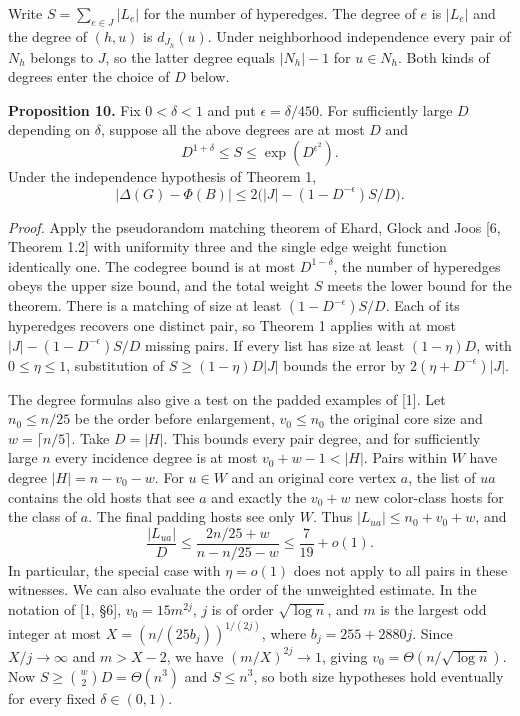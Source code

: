 \documentclass[english,11pt,a4paper]{article}
\begin{document}
Write \(S=\sum_{e\in J}|L_e|\) for the number of hyperedges. The degree of \(e\) is \(|L_e|\) and the degree of \((h,u)\) is \(d_{J_h}(u)\). Under neighborhood independence every pair of \(N_h\) belongs to \(J\), so the latter degree equals \(|N_h|-1\) for \(u\in N_h\). Both kinds of degrees enter the choice of \(D\) below.

\textbf{Proposition 10.} Fix \(0<\delta<1\) and put \(\epsilon=\delta/450\). For sufficiently large \(D\) depending on \(\delta\), suppose all the above degrees are at most \(D\) and \[
D^{1+\delta}\le S\le\exp(D^{\epsilon^2}).
\] Under the independence hypothesis of Theorem 1, \[
|\Delta(G)-\Phi(B)|\le
2\bigl(|J|-(1-D^{-\epsilon})S/D\bigr).
\]

\emph{Proof.} Apply the pseudorandom matching theorem of Ehard, Glock and Joos {[}6, Theorem 1.2{]} with uniformity three and the single edge weight function identically one. The codegree bound is at most \(D^{1-\delta}\), the number of hyperedges obeys the upper size bound, and the total weight \(S\) meets the lower bound for the theorem. There is a matching of size at least \((1-D^{-\epsilon})S/D\). Each of its hyperedges recovers one distinct pair, so Theorem 1 applies with at most \(|J|-(1-D^{-\epsilon})S/D\) missing pairs. If every list has size at least \((1-\eta)D\), with \(0\le\eta\le1\), substitution of \(S\ge(1-\eta)D|J|\) bounds the error by \(2(\eta+D^{-\epsilon})|J|\).

The degree formulas also give a test on the padded examples of {[}1{]}. Let \(n_0\le n/25\) be the order before enlargement, \(v_0\le n_0\) the original core size and \(w=\lceil n/5\rceil\). Take \(D=|H|\). This bounds every pair degree, and for sufficiently large \(n\) every incidence degree is at most \(v_0+w-1<|H|\). Pairs within \(W\) have degree \(|H|=n-v_0-w\). For \(u\in W\) and an original core vertex \(a\), the list of \(ua\) contains the old hosts that see \(a\) and exactly the \(v_0+w\) new color-class hosts for the class of \(a\). The final padding hosts see only \(W\). Thus \(|L_{ua}|\le n_0+v_0+w\), and \[
\frac{|L_{ua}|}{D}\le\frac{2n/25+w}{n-n/25-w}
      \le\frac7{19}+o(1).
\] In particular, the special case with \(\eta=o(1)\) does not apply to all pairs in these witnesses. We can also evaluate the order of the unweighted estimate. In the notation of {[}1, §6{]}, \(v_0=15m^{2j}\), \(j\) is of order \(\sqrt{\log n}\), and \(m\) is the largest odd integer at most \(X=(n/(25b_j))^{1/(2j)}\), where \(b_j=255+2880j\). Since \(X/j\to\infty\) and \(m>X-2\), we have \((m/X)^{2j}\to1\), giving \(v_0=\Theta(n/\sqrt{\log n})\). Now \(S\ge\binom w2D=\Theta(n^3)\) and \(S\le n^3\), so both size hypotheses hold eventually for every fixed \(\delta\in(0,1)\).
\end{document}
